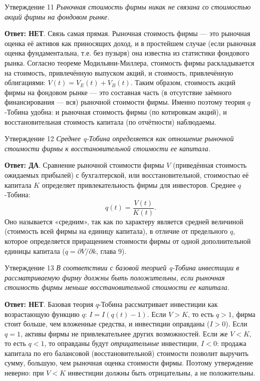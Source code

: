 \documentclass[10pt,a4paper]{article}
\newcommand{\qda}{\textbf{\color{yesgreen}Ответ: ДА}}
\newcommand{\qnet}{\textbf{\color{nored}Ответ: НЕТ}}
\newenvironment{answer}[2]{%
  \begin{qbox}{Утверждение #1}
  \textit{#2}\par\smallskip
}{%
  \end{qbox}\vspace{2pt}
}
\begin{document}
\begin{answer}{11}{Рыночная стоимость фирмы никак не связана со стоимостью акций фирмы на фондовом рынке.}
\qnet. Связь самая прямая. Рыночная стоимость фирмы --- это рыночная оценка её активов как приносящих доход, и в простейшем случае (если рыночная оценка фундаментальна, т.е. без пузыря) она известна из статистики фондового рынка. Согласно теореме Модильяни-Миллера, стоимость фирмы раскладывается на стоимость, привлечённую выпуском акций, и стоимость, привлечённую облигациями: $V(t)=V_E(t)+V_B(t)$. Таким образом, стоимость акций фирмы на фондовом рынке --- это составная часть (в отсутствие заёмного финансирования --- вся) рыночной стоимости фирмы. Именно поэтому теория $q$-Тобина удобна: и рыночная стоимость фирмы (по котировкам акций), и восстановительная стоимость капитала (по отчётности) наблюдаемы.
\end{answer}

\begin{answer}{12}{Среднее q-Тобина определяется как отношение рыночной стоимости фирмы к восстановительной стоимости ее капитала.}
\qda. Сравнение рыночной стоимости фирмы $V$ (приведённая стоимость ожидаемых прибылей) с бухгалтерской, или восстановительной, стоимостью её капитала $K$ определяет привлекательность фирмы для инвесторов. Среднее $q$-Тобина:
\[
q(t)=\dfrac{V(t)}{K(t)}.
\]
Оно называется «средним», так как по характеру является средней величиной (стоимость всей фирмы на единицу капитала), в отличие от предельного $q$, которое определяется приращением стоимости фирмы от одной дополнительной единицы капитала ($q=\partial V/\partial k$, глава 9).
\end{answer}

\begin{answer}{13}{В соответствии с базовой теорией q-Тобина инвестиции в рассматриваемую фирму должны быть положительны, если рыночная стоимость фирмы меньше восстановительной стоимости ее капитала.}
\qnet. Базовая теория $q$-Тобина рассматривает инвестиции как возрастающую функцию $q$: $I=I(q(t)-1)$. Если $V>K$, то есть $q>1$, фирма стоит больше, чем вложенные средства, и инвестиции оправданы ($I>0$). Если $q=1$, активы фирмы не привлекательнее других возможностей. Если же $V<K$, то есть $q<1$, то оправданы будут \emph{отрицательные} инвестиции, $I<0$: продажа капитала по его балансовой (восстановительной) стоимости позволит выручить сумму, большую, чем рыночная оценка стоимости фирмы. Поэтому утверждение неверно: при $V<K$ инвестиции должны быть отрицательны, а не положительны.
\end{answer}
\end{document}
